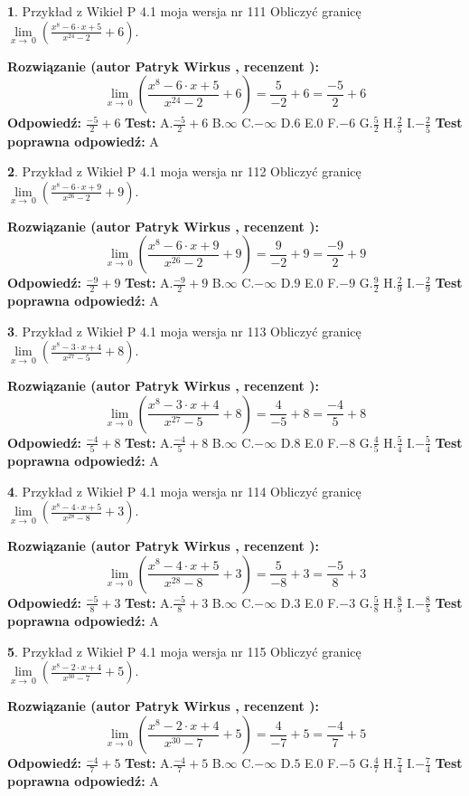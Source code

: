 \documentclass[12pt, a4paper]{article}
\theoremstyle{definition} %
\newtheorem{zad}{}
\newcommand{\zadStart}[1]{\begin{zad}#1\newline}
\newcommand{\zadStop}{\end{zad}}
\newcommand{\rozwStart}[2]{\noindent \textbf{Rozwiązanie (autor #1 , recenzent #2): }\newline}
\newcommand{\rozwStop}{\newline}
\newcommand{\odpStart}{\noindent \textbf{Odpowiedź:}\newline}
\newcommand{\odpStop}{\newline}
\newcommand{\testStart}{\noindent \textbf{Test:}\newline}
\newcommand{\testStop}{\newline}
\newcommand{\kluczStart}{\noindent \textbf{Test poprawna odpowiedź:}\newline}
\newcommand{\kluczStop}{\newline}
\begin{document}
\zadStart{Przykład z Wikieł P 4.1 moja wersja nr 111}
Obliczyć granicę $\lim\limits_{x\to\ 0}(\frac{x^{8}-6 \cdot x +5}{x^{24}-2}+6)$.
\zadStop
\rozwStart{Patryk Wirkus}{}
$$\lim\limits_{x\to\ 0}(\frac{x^{8}-6 \cdot x +5}{x^{24}-2}+6)=\frac{5}{-2}+6=\frac{-5}{2}+6$$
\rozwStop
\odpStart
$\frac{-5}{2}+6$
\odpStop
\testStart
A.$\frac{-5}{2}+6$
B.$\infty$
C.$-\infty$
D.$6$
E.$0$
F.$-6$
G.$\frac{5}{2}$
H.$\frac{2}{5}$
I.$-\frac{2}{5}$
\testStop
\kluczStart
A
\kluczStop



\zadStart{Przykład z Wikieł P 4.1 moja wersja nr 112}
Obliczyć granicę $\lim\limits_{x\to\ 0}(\frac{x^{8}-6 \cdot x +9}{x^{26}-2}+9)$.
\zadStop
\rozwStart{Patryk Wirkus}{}
$$\lim\limits_{x\to\ 0}(\frac{x^{8}-6 \cdot x +9}{x^{26}-2}+9)=\frac{9}{-2}+9=\frac{-9}{2}+9$$
\rozwStop
\odpStart
$\frac{-9}{2}+9$
\odpStop
\testStart
A.$\frac{-9}{2}+9$
B.$\infty$
C.$-\infty$
D.$9$
E.$0$
F.$-9$
G.$\frac{9}{2}$
H.$\frac{2}{9}$
I.$-\frac{2}{9}$
\testStop
\kluczStart
A
\kluczStop



\zadStart{Przykład z Wikieł P 4.1 moja wersja nr 113}
Obliczyć granicę $\lim\limits_{x\to\ 0}(\frac{x^{8}-3 \cdot x +4}{x^{27}-5}+8)$.
\zadStop
\rozwStart{Patryk Wirkus}{}
$$\lim\limits_{x\to\ 0}(\frac{x^{8}-3 \cdot x +4}{x^{27}-5}+8)=\frac{4}{-5}+8=\frac{-4}{5}+8$$
\rozwStop
\odpStart
$\frac{-4}{5}+8$
\odpStop
\testStart
A.$\frac{-4}{5}+8$
B.$\infty$
C.$-\infty$
D.$8$
E.$0$
F.$-8$
G.$\frac{4}{5}$
H.$\frac{5}{4}$
I.$-\frac{5}{4}$
\testStop
\kluczStart
A
\kluczStop



\zadStart{Przykład z Wikieł P 4.1 moja wersja nr 114}
Obliczyć granicę $\lim\limits_{x\to\ 0}(\frac{x^{8}-4 \cdot x +5}{x^{28}-8}+3)$.
\zadStop
\rozwStart{Patryk Wirkus}{}
$$\lim\limits_{x\to\ 0}(\frac{x^{8}-4 \cdot x +5}{x^{28}-8}+3)=\frac{5}{-8}+3=\frac{-5}{8}+3$$
\rozwStop
\odpStart
$\frac{-5}{8}+3$
\odpStop
\testStart
A.$\frac{-5}{8}+3$
B.$\infty$
C.$-\infty$
D.$3$
E.$0$
F.$-3$
G.$\frac{5}{8}$
H.$\frac{8}{5}$
I.$-\frac{8}{5}$
\testStop
\kluczStart
A
\kluczStop



\zadStart{Przykład z Wikieł P 4.1 moja wersja nr 115}
Obliczyć granicę $\lim\limits_{x\to\ 0}(\frac{x^{8}-2 \cdot x +4}{x^{30}-7}+5)$.
\zadStop
\rozwStart{Patryk Wirkus}{}
$$\lim\limits_{x\to\ 0}(\frac{x^{8}-2 \cdot x +4}{x^{30}-7}+5)=\frac{4}{-7}+5=\frac{-4}{7}+5$$
\rozwStop
\odpStart
$\frac{-4}{7}+5$
\odpStop
\testStart
A.$\frac{-4}{7}+5$
B.$\infty$
C.$-\infty$
D.$5$
E.$0$
F.$-5$
G.$\frac{4}{7}$
H.$\frac{7}{4}$
I.$-\frac{7}{4}$
\testStop
\kluczStart
A
\kluczStop
\end{document}

